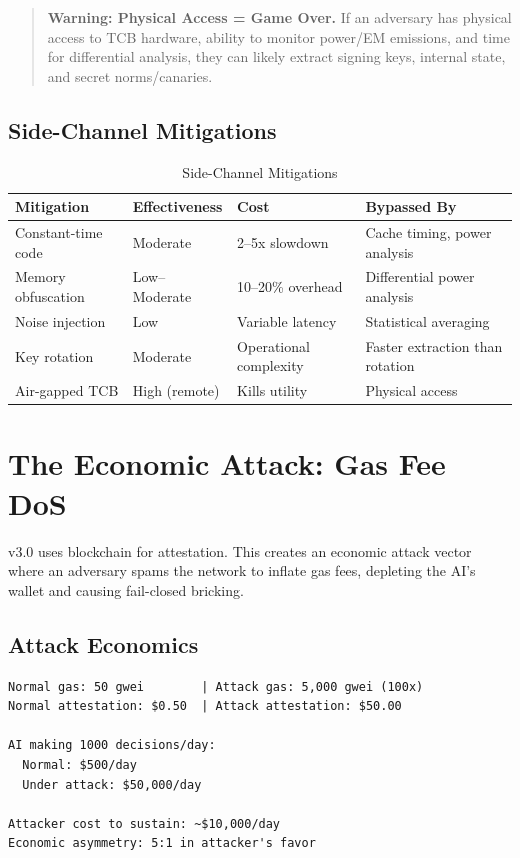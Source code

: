 \documentclass[11pt,letterpaper]{article}
\theoremstyle{definition}
\theoremstyle{remark}
\begin{document}
\begin{quote}
\textbf{Warning: Physical Access = Game Over.} If an adversary has physical access to TCB hardware, ability to monitor power/EM emissions, and time for differential analysis, they can likely extract signing keys, internal state, and secret norms/canaries.
\end{quote}

\subsection{Side-Channel Mitigations}

\begin{table}[h]
\centering
\small
\begin{tabular}{@{}llll@{}}
\toprule
\textbf{Mitigation} & \textbf{Effectiveness} & \textbf{Cost} & \textbf{Bypassed By} \\
\midrule
Constant-time code & Moderate & 2--5x slowdown & Cache timing, power analysis \\
Memory obfuscation & Low--Moderate & 10--20\% overhead & Differential power analysis \\
Noise injection & Low & Variable latency & Statistical averaging \\
Key rotation & Moderate & Operational complexity & Faster extraction than rotation \\
Air-gapped TCB & High (remote) & Kills utility & Physical access \\
\bottomrule
\end{tabular}
\caption{Side-Channel Mitigations}
\end{table}


\section{The Economic Attack: Gas Fee DoS}

v3.0 uses blockchain for attestation. This creates an economic attack vector where an adversary spams the network to inflate gas fees, depleting the AI's wallet and causing fail-closed bricking.

\subsection{Attack Economics}

\begin{verbatim}
Normal gas: 50 gwei        | Attack gas: 5,000 gwei (100x)
Normal attestation: $0.50  | Attack attestation: $50.00

AI making 1000 decisions/day:
  Normal: $500/day
  Under attack: $50,000/day

Attacker cost to sustain: ~$10,000/day
Economic asymmetry: 5:1 in attacker's favor
\end{verbatim}
\end{document}
